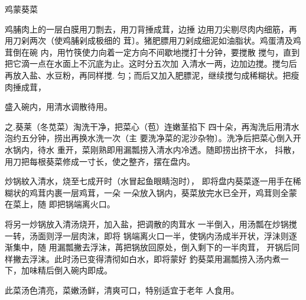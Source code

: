 \begin{recipe}{鸡蒙葵菜}

\ingredients


\cooking

\step 鸡脯肉上的一层白膜用刀剽去，用刀背捶成茸，边捶 边用刀尖剔尽肉内细筋，再用刀剁两次（使鸡脯剁成极细的 茸〕。猪肥膘用刀剁成细泥如油脂状。鸡蛋清及鸡茸倒在碗 内，用竹筷使力向着一定方向不间歇地搅打十分钟，要搅散 搅勻，直到把它滴一点在水面上不沉底为止。这时分五次加 入清水一两，边加边搅。搅匀后再放入盐、水豆粉，再同样搅. 匀；而后又加入肥膘泥，继续搅匀成稀糊状。把瘦肉捶成茸，

盛入碗内，用清水调散待用。

之.葵莱（冬苋菜）淘洗干净，把菜心（苞）连嫩茎掐下 四十朵，再淘洗后用清水泡约五分钟，捞出再换水洗一次（主 要洗净菜的泥沙杂物〕。洗净后把菜心倒入开水锅内，待水 重开，菜刚熟即用漏瓢捞入清水内冷透。随即捞出挤干水， 抖散，用刀把每根葵菜修成一寸长，使之整齐，摆在盘内。

炒锅紋入清水，烧至七成开时（水冒起鱼眼睛泡时）， 即将盘内葵菜逐一用手在稀糊状的鸡茸内裹一层鸡茸，一朵 一朵放入锅内，葵菜放完水已全开，鸡茸则全蒙在菜上，随 即把锅端离火口。

将另一炒锅放入清汤烧开，加入盐，把调散的肉茸水 一半倒入，用汤瓢在炒锅搅一转，汤面则浮一层肉沫，即将 锅端离火口一半，使锅内汤成半开状，浮沬则逐渐集中，随 用漏瓢撇去浮沫，苒把锅放回原处，倒入剩下的一半肉茸， 开锅后同样撇去浮沫。此时汤已变得清彻如白水，即将蒙好 釣葵菜用漏瓢捞入汤内煮一下，加味精后倒入碗内即成。

\notes

此菜汤色清亮，菜嫩汤鲜，清爽可口，特别适宜于老年 人食用。

\end{recipe}

